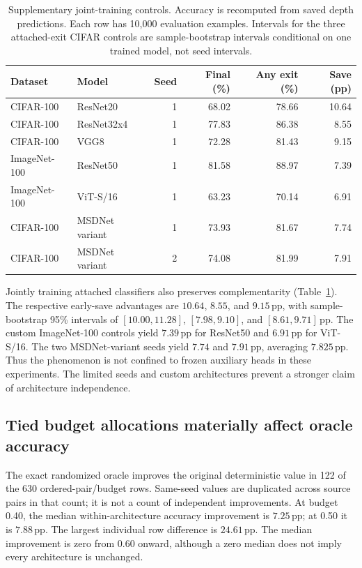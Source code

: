 \documentclass[11pt,a4paper]{article}
\newcommand{\pp}{\,\mathrm{pp}}
\begin{document}
\begin{table}[t]
\centering\small
\caption{Supplementary joint-training controls. Accuracy is recomputed from saved depth predictions. Each row has 10,000 evaluation examples. Intervals for the three attached-exit CIFAR controls are sample-bootstrap intervals conditional on one trained model, not seed intervals.}
\begin{tabular}{@{}llrrrr@{}}
\toprule
Dataset & Model & Seed & Final (\%) & Any exit (\%) & Save (pp) \\
\midrule
CIFAR-100 & ResNet20 & 1 & 68.02 & 78.66 & 10.64 \\
CIFAR-100 & ResNet32x4 & 1 & 77.83 & 86.38 & 8.55 \\
CIFAR-100 & VGG8 & 1 & 72.28 & 81.43 & 9.15 \\
ImageNet-100 & ResNet50 & 1 & 81.58 & 88.97 & 7.39 \\
ImageNet-100 & ViT-S/16 & 1 & 63.23 & 70.14 & 6.91 \\
CIFAR-100 & MSDNet variant & 1 & 73.93 & 81.67 & 7.74 \\
CIFAR-100 & MSDNet variant & 2 & 74.08 & 81.99 & 7.91 \\
\bottomrule
\end{tabular}
\label{tab:controls}
\end{table}

Jointly training attached classifiers also preserves complementarity (Table~\ref{tab:controls}). The respective early-save advantages are $10.64$, $8.55$, and $9.15\pp$, with sample-bootstrap 95\% intervals of $[10.00,11.28]$, $[7.98,9.10]$, and $[8.61,9.71]\pp$. The custom ImageNet-100 controls yield $7.39\pp$ for ResNet50 and $6.91\pp$ for ViT-S/16. The two MSDNet-variant seeds yield $7.74$ and $7.91\pp$, averaging $7.825\pp$. Thus the phenomenon is not confined to frozen auxiliary heads in these experiments. The limited seeds and custom architectures prevent a stronger claim of architecture independence.

\subsection{Tied budget allocations materially affect oracle accuracy}
The exact randomized oracle improves the original deterministic value in 122 of the 630 ordered-pair/budget rows. Same-seed values are duplicated across source pairs in that count; it is not a count of independent improvements. At budget 0.40, the median within-architecture accuracy improvement is $7.25\pp$; at 0.50 it is $7.88\pp$. The largest individual row difference is $24.61\pp$. The median improvement is zero from 0.60 onward, although a zero median does not imply every architecture is unchanged.
\end{document}
